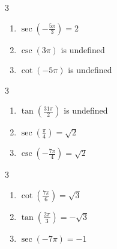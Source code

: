 \documentclass{ximera}
\begin{document}
\begin{multicols}{3}

\begin{enumerate}

\setcounter{enumi}{\value{HW}}

\item $\sec \left( -\frac{5\pi}{3} \right) = 2$
\item $\csc \left( 3\pi \right)$ is undefined 
\item $\cot \left( -5\pi \right)$ is undefined 

\setcounter{HW}{\value{enumi}}

\end{enumerate}

\end{multicols}

\begin{multicols}{3}

\begin{enumerate}

\setcounter{enumi}{\value{HW}}

\item $\tan \left( \frac{31\pi}{2} \right)$ is undefined
\item $\sec \left( \frac{\pi}{4} \right) = \sqrt{2}$ 
\item $\csc \left( -\frac{7\pi}{4} \right) = \sqrt{2}$

\setcounter{HW}{\value{enumi}}

\end{enumerate}

\end{multicols}

\begin{multicols}{3}

\begin{enumerate}

\setcounter{enumi}{\value{HW}}

\item $\cot \left( \frac{7\pi}{6} \right) = \sqrt{3}$
\item $\tan \left( \frac{2\pi}{3} \right) = -\sqrt{3}$
\item $\sec \left( -7\pi \right) = -1$ 

\setcounter{HW}{\value{enumi}}

\end{enumerate}

\end{multicols}
\end{document}

